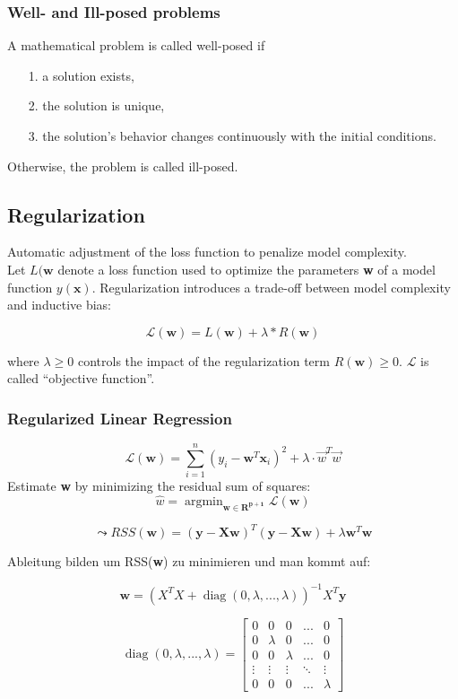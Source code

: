 \documentclass[11pt,a4paper]{article}
\DeclareMathOperator*{\argmin}{argmin}
\DeclareMathOperator*{\diag}{diag}
\begin{document}
\begin{flushleft}
\subsubsection{Well- and Ill-posed problems}
A mathematical problem is called well-posed if
\begin{itemize}
\item[1.] a solution exists,
\item[2.] the solution is unique,
\item[3.]the solution’s behavior changes continuously with the initial conditions.
\end{itemize}
Otherwise, the problem is called ill-posed.

\subsection{Regularization}
Automatic adjustment of the loss function to penalize model complexity. \\
Let $L(\textbf{w}$ denote a loss function used to optimize the parameters \textbf{w} of a model
function $y(\textbf{x})$. Regularization introduces a trade-off between model complexity and inductive bias:

$$\mathcal{L}(\textbf{w}) = L(\textbf{w}) + \lambda * R(\textbf{w})$$

where $\lambda \geq 0$ controls the impact of the regularization term $R(\textbf{w}) \geq 0$. $\mathcal{L} $ is called “objective function”.

\subsubsection{Regularized Linear Regression}

$$\mathcal{L}(\textbf{w}) = \displaystyle\sum_{i=1}^{n}(y_i - \textbf{w}^T \textbf{x}_i)^2 + \lambda \cdot \overrightarrow{w}^T \overrightarrow{w}$$
Estimate \textbf{w} by minimizing the residual sum of squares:
$$\hat{w}= \argmin_{\mathbf{w\in R^{p+1}}} \mathcal{L}(\textbf{w}) $$

$$ \leadsto RSS(\textbf{w}) = (\textbf{y} -\textbf{Xw})^T (\textbf{y} -\textbf{Xw})+ \lambda \textbf{w}^T \textbf{w} $$

Ableitung bilden um RSS(\textbf{w}) zu minimieren und man kommt auf:

$$ \textbf{w} = (X^T X + \diag(0,\lambda, ..., \lambda))^{-1} X^T \textbf{y} $$

$$ \diag(0,\lambda, ..., \lambda) = \begin{bmatrix}
       0 & 0 & 0 & ... & 0 \\[0.3em]
       0 & \lambda & 0 & ... & 0 \\[0.3em]
       0 & 0 & \lambda & ... & 0 \\[0.3em]
       \vdots & \vdots & \vdots & \ddots & \vdots\\[0.3em]
       0 & 0 & 0 & ...& \lambda
     \end{bmatrix} $$
     

\end{flushleft}
\end{document}
